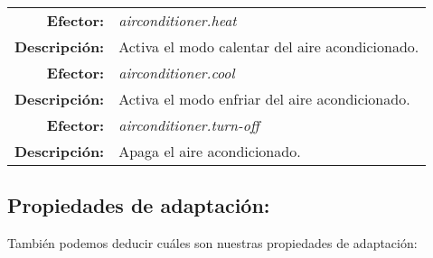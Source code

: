 \begin{table}[htb]
  \centering

  \begin{tabular}{|r p{11.5cm}|}
    \hline
    \textbf{Efector:} & \emph{airconditioner.heat}  \\
    \textbf{Descripción:} & Activa el modo calentar del aire acondicionado. \\
    \hline
    \textbf{Efector:} & \emph{airconditioner.cool}  \\
    \textbf{Descripción:} & Activa el modo enfriar del aire acondicionado. \\
    \hline
    \textbf{Efector:} & \emph{airconditioner.turn-off}  \\
    \textbf{Descripción:} & Apaga el aire acondicionado. \\
    \hline
  \end{tabular}
\end{table}

\subsection{Propiedades de adaptación:}

También podemos deducir cuáles son nuestras propiedades de adaptación:

